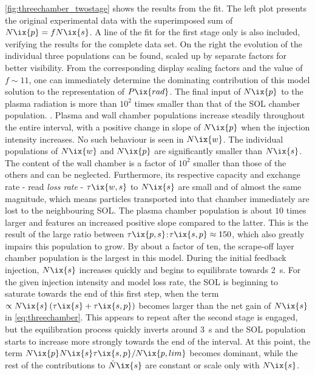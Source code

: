             \autoref{fig:threechamber_twostage} shows the results from the fit. The left plot presents the original experimental data with the superimposed sum of $N\ix{p}=fN\ix{s}$. A line of the fit for the first stage only is also included, verifying the results for the complete data set. On the right the evolution of the individual three populations can be found, scaled up by separate factors for better visibility. From the corresponding display scaling factors and the value of $f\sim11$, one can immediately determine the dominating contribution of this model solution to the representation of $P\ix{rad}$. The final input of $N\ix{p}$ to the plasma radiation is more than $10^{2}$ times smaller than that of the SOL chamber population. . Plasma and wall chamber populations increase steadily throughout the entire interval, with a positive change in slope of $N\ix{p}$ when the injection intensity increases. No such behaviour is seen in $N\ix{w}$. The individual populations of $N\ix{w}$ and $N\ix{p}$ are significantly smaller than $N\ix{s}$. The content of the wall chamber is a factor of $10^{2}$ smaller than those of the others and can be neglected. Furthermore, its respective capacity and exchange rate - read \textit{loss rate} - $\tau\ix{w,s}$ to $N\ix{s}$ are small and of almost the same magnitude, which means particles transported into that chamber immediately are lost to the neighbouring SOL. The plasma chamber population is about $10$ times larger and features an increased positive slope compared to the latter. This is the result of the large ratio between $\tau\ix{p,s}$:$\tau\ix{s,p}\approx150$, which also greatly impairs this population to grow. By about a factor of ten, the scrape-off layer chamber population is the largest in this model. During the initial feedback injection, $N\ix{s}$ increases quickly and begins to equilibrate towards \SI{2}{\second}. For the given injection intensity and model loss rate, the SOL is beginning to saturate towards the end of this first step, when the term $\propto N\ix{s}\left(\tau\ix{s}+\tau\ix{s,p}\right)$ becomes larger than the net gain of $N\ix{s}$ in \cref{eq:threechamber}. This appears to repeat after the second stage is engaged, but the equilibration process quickly inverts around \SI{3}{\second} and the SOL population starts to increase more strongly towards the end of the interval. At this point, the term $N\ix{p}N\ix{s}\tau\ix{s,p}/N\ix{p,lim}$ becomes dominant, while the rest of the contributions to $\dot{N}\ix{s}$ are constant or scale only with $N\ix{s}$.\\%
